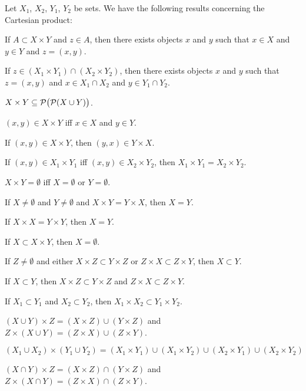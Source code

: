 \documentclass{article}
\begin{document}
\medbreak
Let $X_{1}$, $X_{2}$, $Y_{1}$, $Y_{2}$ be sets.
We have the following results concerning the Cartesian product:
\begin{thm}
\item\label{zfmisc1:84} If $A\subset X\times Y$ and $z\in A$,
  then there exists objects $x$ and $y$ such that $x\in X$ and $y\in Y$
  and $z=(x,y)$.
\item\label{zfmisc1:85} If $z\in(X_{1}\times Y_{1})\cap(X_{2}\times Y_{2})$,
  then there exists objects $x$ and $y$ such that $z=(x,y)$ and $x\in X_{1}\cap X_{2}$
  and $y\in Y_{1}\cap Y_{2}$.
\item\label{zfmisc1:86} $X\times Y\subseteq\mathcal{P}\bigl(\mathcal{P}(X\cup Y)\bigr)$.
\item\label{zfmisc1:87} $(x,y)\in X\times Y$ iff $x\in X$ and $y\in Y$.
\item\label{zfmisc1:88} If $(x,y)\in X\times Y$, then $(y,x)\in Y\times X$.
\item\label{zfmisc1:89} If $(x,y)\in X_{1}\times Y_{1}$ iff $(x,y)\in X_{2}\times Y_{2}$,
  then $X_{1}\times Y_{1} = X_{2}\times Y_{2}$.
\item\label{zfmisc1:90} $X\times Y=\emptyset$ iff $X=\emptyset$ or $Y=\emptyset$.
\item\label{zfmisc1:91} If $X\neq\emptyset$ and $Y\neq\emptyset$ and
  $X\times Y=Y\times X$, then $X=Y$.
\item\label{zfmisc1:92} If $X\times X=Y\times Y$, then $X=Y$.
\item\label{zfmisc1:93} If $X\subset X\times Y$, then $X=\emptyset$.
\item\label{zfmisc1:94} If $Z\neq\emptyset$ and either $X\times Z\subset Y\times Z$
  or $Z\times X\subset Z\times Y$, then $X\subset Y$.
\item\label{zfmisc1:95} If $X\subset Y$, then $X\times Z\subset Y\times Z$
  and $Z\times X\subset Z\times Y$.
\item\label{zfmisc1:96} If $X_{1}\subset Y_{1}$ and $X_{2}\subset Y_{2}$,
  then $X_{1}\times X_{2}\subset Y_{1}\times Y_{2}$.
\item\label{zfmisc1:97} $(X\cup Y)\times Z=(X\times Z)\cup(Y\times Z)$
  and $Z\times(X\cup Y)=(Z\times X)\cup(Z\times Y)$.
\item\label{zfmisc1:98}
  $(X_{1}\cup X_{2})\times(Y_{1}\cup Y_{2}) = (X_{1}\times Y_{1})\cup(X_{1}\times Y_{2})\cup(X_{2}\times Y_{1})\cup(X_{2}\times Y_{2})$
\item\label{zfmisc1:99} $(X\cap Y)\times Z=(X\times Z)\cap(Y\times Z)$
  and $Z\times(X\cap Y)=(Z\times X)\cap(Z\times Y)$.

\end{thm}
\end{document}

